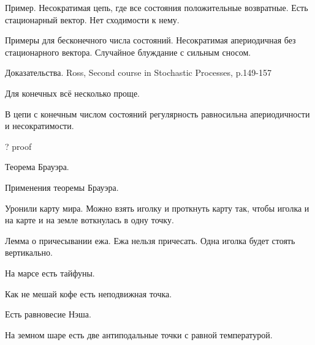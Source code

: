 Пример. Несократимая цепь, где все состояния положительные возвратные. Есть стационарный вектор. Нет сходимости к нему.


Примеры для бесконечного числа состояний. Несократимая апериодичная без стационарного вектора. Случайное блуждание с сильным сносом.


Доказательства. Ross, Second course in Stochastic Processes, p.149-157

Для конечных всё несколько проще. 

\begin{theorem}
В цепи с конечным числом состояний регулярность равносильна апериодичности и несократимости.
\end{theorem}

? proof


Теорема Брауэра.


Применения теоремы Брауэра.

Уронили карту мира. Можно взять иголку и проткнуть карту так, чтобы иголка и на карте и на земле воткнулась в одну точку.


Лемма о причесывании ежа. Ежа нельзя причесать. Одна иголка будет стоять вертикально.


На марсе есть тайфуны. 


Как не мешай кофе есть неподвижная точка.


Есть равновесие Нэша.


На земном шаре есть две антиподальные точки с равной температурой.\\


